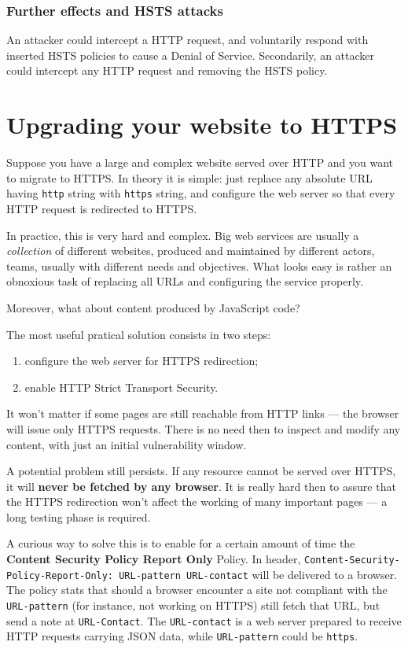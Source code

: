\documentclass[10pt]{extreport}
\begin{document}
\subsubsection{Further effects and HSTS attacks}

An attacker could intercept a HTTP request, and voluntarily respond with
inserted HSTS policies to cause a Denial of Service. Secondarily, an attacker
could intercept any HTTP request and removing the HSTS policy.

\section{Upgrading your website to HTTPS}

Suppose you have a large and complex website served over HTTP and you want to
migrate to HTTPS. In theory it is simple: just replace any absolute URL having
\texttt{http} string with \texttt{https} string, and configure the web server
so that every HTTP request is redirected to HTTPS.

In practice, this is very hard and complex. Big web services are usually a
\emph{collection} of different websites, produced and maintained by different
actors, teams, usually with different needs and objectives. What looks easy is
rather an obnoxious task of replacing all URLs and configuring the service
properly.

Moreover, what about content produced by JavaScript code?

The most useful pratical solution consists in two steps:
\begin{enumerate}
    \item configure the web server for HTTPS redirection;
    \item enable HTTP Strict Transport Security.
\end{enumerate}

It won't matter if some pages are still reachable from HTTP links --- the
browser will issue only HTTPS requests. There is no need then to inspect and
modify any content, with just an initial vulnerability window.

A potential problem still persists. If any resource cannot be served over
HTTPS, it will \textbf{never be fetched by any browser}. It is really hard then
to assure that the HTTPS redirection won't affect the working of many important
pages --- a long testing phase is required.

A curious way to solve this is to enable for a certain amount of time the
\textbf{Content Security Policy Report Only} Policy. In header,
\texttt{Content\--Security\--Policy\--Report\--Only: URL\--pattern
URL\--contact} will be delivered to a browser. The policy stats that should a
browser encounter a site not compliant with the \texttt{URL-pattern} (for
instance, not working on HTTPS) still fetch that URL, but send a note at
\texttt{URL-Contact}. The \texttt{URL-contact} is a web server prepared to
receive HTTP requests carrying JSON data, while \texttt{URL\--pat\-tern} could be
\texttt{https}.
\end{document}
